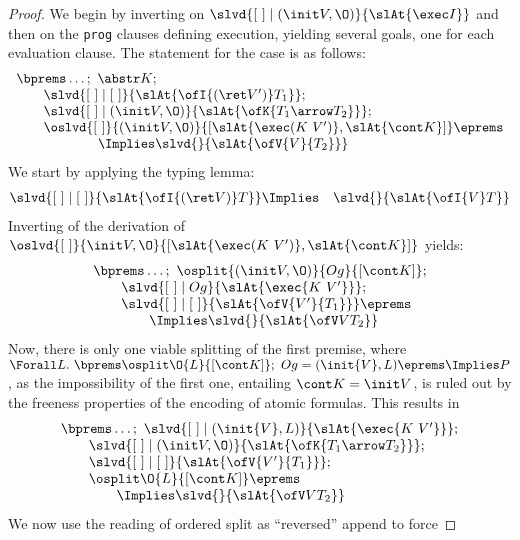 \documentclass[final]{svjour3}
\begin{document}
\begin{proof}
We begin by inverting on
$\slvd{\elist\coln(\init V, \O)}{\slAt{\exec I}}$
and then on the \texttt{prog} clauses defining execution, yielding
several goals, one for each evaluation clause.  The statement for the
 case is as follows:
$$
\begin{array}{l}
  \bprems \dots;\ \abstr K; \\
\qquad\slvd{\elist\coln\elist}{\slAt{\ofI {(\ret V')} T_1}};\\
\qquad\slvd {\elist\coln(\init V, \O)}{\slAt{\ofK {T_1\arrow  T_2}}};\\
\qquad\oslvd{\elist}{(\init V, \O)}{[\slAt{\exec (K\ V')},\slAt{\cont
    K}]}\eprems\\ 
\qquad\qquad\qquad\Implies
\slvd{}{\slAt{\ofV{V}{T_2}}}
\end{array}
$$
We start by applying the typing lemma:
\begin{eqnarray*}
  \slvd{\elist\coln\elist}{\slAt{\ofI {(\ret V)} T}} & \Implies &
\slvd{}{\slAt{\ofI { V} T}}
\end{eqnarray*}
Inverting of the derivation of 
$\oslvd{\elist}{\init V,  \O}{[\slAt{\exec (K\ V')},\slAt{\cont K}]}$
  yields:
$$
\begin{array}{l}
  \bprems\dots;\ \osplit {(\init V,\O)} {Og} {[\cont K]};\\
\qquad\slvd{\elist\coln Og}{\slAt{\exec  {K\ V'} }};\\
\qquad\slvd{\elist\coln \elist}{\slAt{\ofV {V'} {T_1} }}\eprems\\
\qquad\qquad\Implies
\slvd{}{\slAt{\ofV V {T_2} }}
\end{array}
$$
Now, there is only one viable splitting of the first premise, where 
$\Forall L.\ \bprems\osplit \O{L} {[\cont K]} ;\,\,  
Og = (\init{V},  L) \eprems \Implies P$,
as the impossibility of the first one, entailing $\cont K = \init V$,
is ruled out by the freeness properties of the encoding of atomic
formulas. This  results in
$$
\begin{array}{l}
   \bprems\dots;\ \slvd{\elist\coln (\init{V},  L)}{\slAt{\exec  {K\
         V'} }};\\
\qquad\slvd {\elist\coln(\init V, \O)}{\slAt{\ofK {T_1\arrow  T_2}}};\\
\qquad\slvd{\elist\coln \elist}{\slAt{\ofV {V'} {T_1} }};\\
\qquad\osplit \O{L} {[\cont K]}\eprems\\
\qquad\qquad\Implies
\slvd{}{\slAt{\ofV V {T_2} }}
\end{array}
$$
We now use the reading of ordered split as  ``reversed'' append to force

\end{proof}
\end{document}
